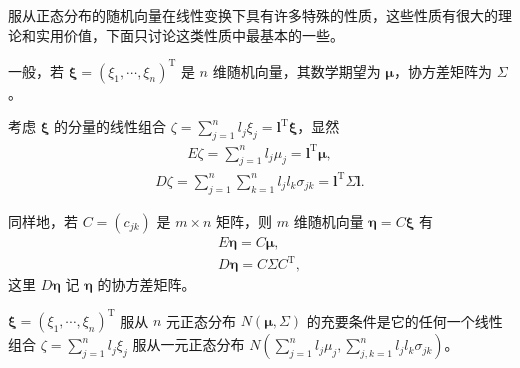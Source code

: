 \documentclass[../../main.tex]{subfiles}
\begin{document}
服从正态分布的随机向量在线性变换下具有许多特殊的性质，这些性质有很大的理论和实用价值，下面只讨论这类性质中最基本的一些。

一般，若 $\boldsymbol{\xi}=(\xi_1,\cdots,\xi_n)^{\mathrm{T}}$ 是 $n$ 维随机向量，其数学期望为 $\boldsymbol{\mu}$，协方差矩阵为 $\Sigma$。

考虑 $\boldsymbol{\xi}$ 的分量的线性组合 $\zeta=\sum_{j=1}^n l_j\xi_j=\boldsymbol{l}^{\mathrm{T}}\boldsymbol{\xi}$，显然
\begin{align}
E\zeta=\sum_{j=1}^n l_j\mu_j=\boldsymbol{l}^{\mathrm{T}}\boldsymbol{\mu},\label{align:ch04-线性组合期望}
\end{align}
\begin{align}
D\zeta=\sum_{j=1}^n\sum_{k=1}^n l_j l_k\sigma_{jk}=\boldsymbol{l}^{\mathrm{T}}\Sigma\boldsymbol{l}.\label{align:ch04-线性组合方差}
\end{align}

同样地，若 $C=(c_{jk})$ 是 $m\times n$ 矩阵，则 $m$ 维随机向量 $\boldsymbol{\eta}=C\boldsymbol{\xi}$ 有
\begin{align}
E\boldsymbol{\eta}=C\boldsymbol{\mu},\label{align:ch04-线性变换期望}\\
D\boldsymbol{\eta}=C\Sigma C^{\mathrm{T}},\label{align:ch04-线性变换协方差}
\end{align}
这里 $D\boldsymbol{\eta}$ 记 $\boldsymbol{\eta}$ 的协方差矩阵。

\begin{theorem}[正态性的线性组合刻画]\label{theorem:ch04-线性组合正态}
$\boldsymbol{\xi}=(\xi_1,\cdots,\xi_n)^{\mathrm{T}}$ 服从 $n$ 元正态分布 $N(\boldsymbol{\mu},\Sigma)$ 的充要条件是它的任何一个线性组合 $\zeta=\sum_{j=1}^n l_j\xi_j$ 服从一元正态分布 $N\left(\sum_{j=1}^n l_j\mu_j,\sum_{j,k=1}^n l_j l_k\sigma_{jk}\right)$。
\end{theorem}
\end{document}

